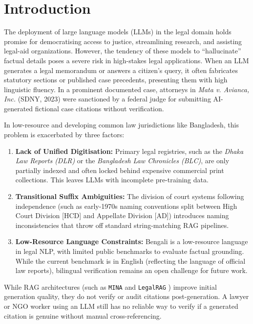 \documentclass[conference]{IEEEtran}
\begin{document}
\section{Introduction}
The deployment of large language models (LLMs) in the legal domain holds promise for democratising access to justice, streamlining research, and assisting legal-aid organizations. However, the tendency of these models to ``hallucinate'' factual details poses a severe risk in high-stakes legal applications. When an LLM generates a legal memorandum or answers a citizen's query, it often fabricates statutory sections or published case precedents, presenting them with high linguistic fluency. In a prominent documented case, attorneys in \textit{Mata v. Avianca, Inc.} (SDNY, 2023) \cite{mata2023} were sanctioned by a federal judge for submitting AI-generated fictional case citations without verification.

In low-resource and developing common law jurisdictions like Bangladesh, this problem is exacerbated by three factors:
\begin{enumerate}
\item \textbf{Lack of Unified Digitisation:} Primary legal registries, such as the \textit{Dhaka Law Reports (DLR)} or the \textit{Bangladesh Law Chronicles (BLC)}, are only partially indexed and often locked behind expensive commercial print collections. This leaves LLMs with incomplete pre-training data.
\item \textbf{Transitional Suffix Ambiguities:} The division of court systems following independence (such as early-1970s naming conventions split between High Court Division [HCD] and Appellate Division [AD]) introduces naming inconsistencies that throw off standard string-matching RAG pipelines.
\item \textbf{Low-Resource Language Constraints:} Bengali is a low-resource language in legal NLP, with limited public benchmarks to evaluate factual grounding. While the current benchmark is in English (reflecting the language of official law reports), bilingual verification remains an open challenge for future work.
\end{enumerate}

While RAG architectures (such as \texttt{MINA} \cite{mina2026} and \texttt{LegalRAG} \cite{legalrag2025}) improve initial generation quality, they do not verify or audit citations post-generation. A lawyer or NGO worker using an LLM still has no reliable way to verify if a generated citation is genuine without manual cross-referencing.
\end{document}
